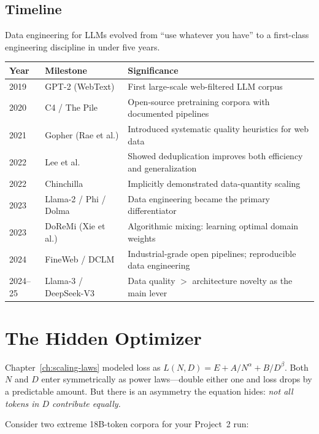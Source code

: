 \subsection*{Timeline}

Data engineering for LLMs evolved from ``use whatever you have'' to a first-class engineering discipline in under five years.

\begin{center}
\begin{tabularx}{\textwidth}{@{}lp{4cm}X@{}}
\toprule
\textbf{Year} & \textbf{Milestone} & \textbf{Significance} \\
\midrule
2019 & GPT-2 (WebText) & First large-scale web-filtered LLM corpus \\
2020 & C4 / The Pile & Open-source pretraining corpora with documented pipelines \\
2021 & Gopher (Rae et al.) & Introduced systematic quality heuristics for web data \\
2022 & Lee et al.\ & Showed deduplication improves both efficiency and generalization \\
2022 & Chinchilla & Implicitly demonstrated data-quantity scaling \\
2023 & Llama-2 / Phi / Dolma & Data engineering became the primary differentiator \\
2023 & DoReMi (Xie et al.) & Algorithmic mixing: learning optimal domain weights \\
2024 & FineWeb / DCLM & Industrial-grade open pipelines; reproducible data engineering \\
2024--25 & Llama-3 / DeepSeek-V3 & Data quality $>$ architecture novelty as the main lever \\
\bottomrule
\end{tabularx}
\end{center}


\section{The Hidden Optimizer}
\label{sec:hidden-optimizer}

Chapter~\ref{ch:scaling-laws} modeled loss as $L(N, D) = E + A/N^\alpha + B/D^\beta$. Both $N$ and $D$ enter symmetrically as power laws---double either one and loss drops by a predictable amount. But there is an asymmetry the equation hides: \emph{not all tokens in $D$ contribute equally.}

Consider two extreme 18B-token corpora for your Project~2 run:

